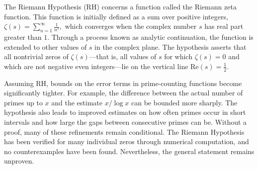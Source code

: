 The Riemann Hypothesis (RH) concerns a function called the Riemann zeta function. This function is initially defined as a sum over positive integers, $\zeta(s) = \sum_{n=1}^\infty \frac{1}{n^s},$
which converges when the complex number $s$ has real part greater than $1$. Through a process known as analytic continuation, the function is extended to other values of $s$ in the complex plane. The hypothesis asserts that all nontrivial zeros of $\zeta(s)$—that is, all values of $s$ for which $\zeta(s) = 0$ and which are not negative even integers—lie on the vertical line $\mathrm{Re}(s) = \tfrac{1}{2}$.

Assuming RH, bounds on the error terms in prime-counting functions become significantly tighter. For example, the difference between the actual number of primes up to $x$ and the estimate $x / \log x$ can be bounded more sharply. The hypothesis also leads to improved estimates on how often primes occur in short intervals and how large the gaps between consecutive primes can be. Without a proof, many of these refinements remain conditional. The Riemann Hypothesis has been verified for many individual zeros through numerical computation, and no counterexamples have been found. Nevertheless, the general statement remains unproven.
\newpage

